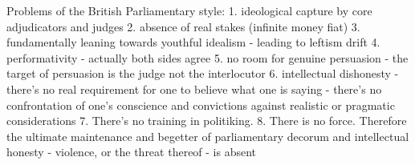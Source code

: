 

Problems of the British Parliamentary style: 
1. ideological capture by core adjudicators and judges
2. absence of real stakes (infinite money fiat)
3. fundamentally leaning towards youthful idealism - leading to leftism drift
4. performativity - actually both sides agree 
5. no room for genuine persuasion - the target of persuasion is the judge not the interlocutor
6. intellectual dishonesty - there's no real requirement for one to believe what one is saying - there's no confrontation of one's conscience and convictions against realistic or pragmatic considerations
7. There's no training in politiking.
8. There is no force. Therefore the ultimate maintenance and begetter of parliamentary decorum and intellectual honesty - violence, or the threat thereof - is absent

